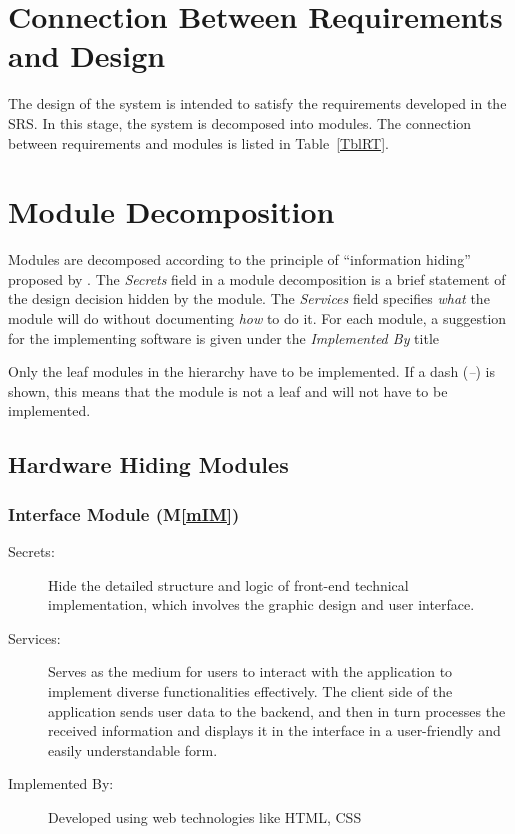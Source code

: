 \documentclass[12pt, titlepage]{article}
\newcommand{\mref}[1]{M\ref{#1}}
\begin{document}
\newpage
\section{Connection Between Requirements and Design} \label{SecConnection}

The design of the system is intended to satisfy the requirements developed in
the SRS. In this stage, the system is decomposed into modules. The connection
between requirements and modules is listed in Table~\ref{TblRT}.

\section{Module Decomposition} \label{SecMD}

Modules are decomposed according to the principle of ``information hiding''
proposed by \citet{ParnasEtAl1984}. The \emph{Secrets} field in a module
decomposition is a brief statement of the design decision hidden by the
module. The \emph{Services} field specifies \emph{what} the module will do
without documenting \emph{how} to do it. For each module, a suggestion for the
implementing software is given under the \emph{Implemented By} title

Only the leaf modules in the hierarchy have to be implemented. If a dash
(\emph{--}) is shown, this means that the module is not a leaf and will not have
to be implemented.

\subsection{Hardware Hiding Modules }

\subsubsection{Interface Module (\mref{mIM})}
\begin{description}
\item[Secrets:]Hide the detailed structure and logic of front-end technical implementation, which involves the graphic design and user interface.
\item[Services:]Serves as the medium for users to interact with the application to implement diverse functionalities effectively. The client side of the application sends user data to the backend, and then in turn processes the received information and displays it in the interface in a user-friendly and easily understandable form. 
\item[Implemented By:] Developed using web technologies like HTML, CSS

\end{description}
\end{document}
